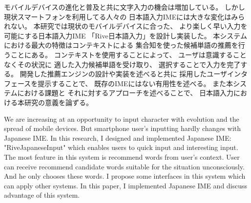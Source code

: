 


\begin{jabstract}

モバイルデバイスの進化と普及と共に文字入力の機会は増加している。
しかし現状スマートフォンを利用してる人々の
日本語入力IMEには大きな変化はみられない。
本研究では現状のモバイルデバイスに合った、
より楽しく早い入力を可能にする日本語入力IME
「Rive日本語入力」を設計し実装した。
本システムにおける最大の特徴はコンテキストによる
集合知を使った候補単語の推薦を行うことにある。
コンテキストを使用することによって、
ユーザは意識することなくその状況に
適した入力候補単語を受け取り、
選択することで入力を完了する。
開発した推薦エンジンの設計や実装を述べると共に
採用したユーザインタフェースを提示することで、
既存のIMEにはない有用性を述べる。
また本システムにおける課題と
それに対するアプローチを述べることで、
日本語入力における本研究の意義を論ずる。

\end{jabstract}

\begin{eabstract}

We are increasing at an opportunity to input character
with evolution and the spread of mobile devices.
But smartphone user's inputting hardly changes with Japanese IME.
In this research, I designed and implemented Japanese IME:
"RiveJapaneseInput" which enables users
to quick input and interesting input.
The most feature in this system is recommend words from
user's context.
User can receive recommend candidate words suitable for
the situation unconsciously.
And he only chooses these words.
I propose some interfaces in this system which can apply
other systems.
In this paper, I implemented Japanese IME
and discuss advantage of this system.

\end{eabstract}
